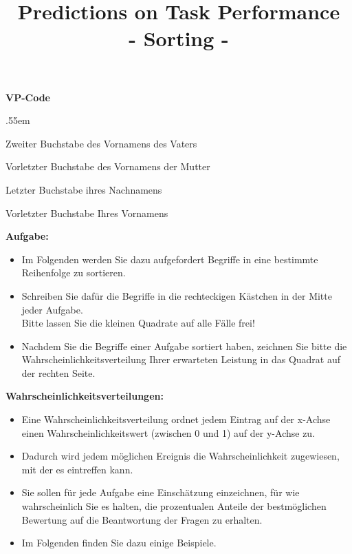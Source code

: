 \documentclass[
ngerman,
accentcolor=9c,%
identbarcolor=9c,
]{tudaexercise}
\title{Predictions on Task Performance\\- Sorting -}
\begin{document}
\maketitle
\vspace{-3mm}


\textbf{VP-Code}
\begin{itemize}
	\begin{minipage}{.45\textwidth}
		\vspace{-2cm}
		\itemsep.55em
		\item Zweiter Buchstabe des Vornamens des Vaters
		\item Vorletzter Buchstabe des Vornamens der Mutter
		\item Letzter Buchstabe ihres Nachnamens
		\item Vorletzter Buchstabe Ihres Vornamens	
	\end{minipage}
	\begin{minipage}{.55\textwidth}
		
	\end{minipage}
\end{itemize}

\textbf{Aufgabe:}
\begin{itemize}
	\item Im Folgenden werden Sie dazu aufgefordert Begriffe in eine bestimmte Reihenfolge zu sortieren.
	\item Schreiben Sie dafür die Begriffe in die rechteckigen Kästchen in der Mitte jeder Aufgabe.\\Bitte lassen Sie die kleinen Quadrate auf alle Fälle frei!
	\item Nachdem Sie die Begriffe einer Aufgabe sortiert haben, zeichnen Sie bitte die Wahrscheinlichkeitsverteilung Ihrer erwarteten Leistung in das  Quadrat auf der rechten Seite.
	
\end{itemize}

\textbf{Wahrscheinlichkeitsverteilungen:}
\begin{itemize}
	\item Eine Wahrscheinlichkeitsverteilung ordnet jedem Eintrag auf der x-Achse einen Wahrscheinlichkeitswert (zwischen 0 und 1) auf der y-Achse zu.
	\item Dadurch wird jedem möglichen Ereignis die Wahrscheinlichkeit zugewiesen, mit der es eintreffen kann.
	\item Sie sollen für jede Aufgabe eine Einschätzung einzeichnen, für wie wahrscheinlich Sie es halten, die prozentualen Anteile der bestmöglichen Bewertung auf die Beantwortung der Fragen zu erhalten. 
	\item Im Folgenden finden Sie dazu einige Beispiele.
\end{itemize}
\end{document}
